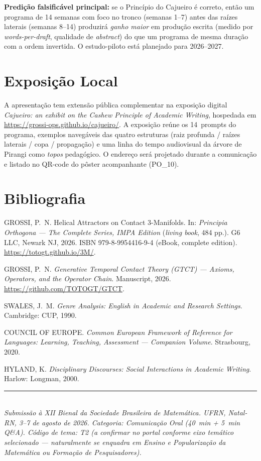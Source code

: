 \documentclass[11pt,a4paper]{article}
\begin{document}
\noindent \textbf{Predição falsificável principal:} se o Princípio do Cajueiro é correto, então um programa de 14 semanas com foco no tronco (semanas 1--7) antes das raízes laterais (semanas 8--14) produzirá \emph{ganho maior} em produção escrita (medido por \emph{words-per-draft}, qualidade de \emph{abstract}) do que um programa de mesma duração com a ordem invertida. O estudo-piloto está planejado para 2026--2027.

\section*{Exposição Local}

A apresentação tem extensão pública complementar na exposição digital \emph{Cajueiro: an exhibit on the Cashew Principle of Academic Writing}, hospedada em \url{https://grossi-ops.github.io/cajueiro/}. A exposição reúne os 14~prompts do programa, exemplos navegáveis das quatro estruturas (raiz profunda / raízes laterais / copa / propagação) e uma linha do tempo audiovisual da árvore de Pirangi como \emph{topos} pedagógico. O endereço será projetado durante a comunicação e listado no QR-code do pôster acompanhante (PO\_10).

\section*{Bibliografia}

\begin{enumerate}[leftmargin=2em,itemsep=0em,label={[\arabic*]}]
  \item GROSSI, P.~N. Helical Attractors on Contact 3-Manifolds. In: \emph{Principia Orthogona --- The Complete Series, IMPA Edition} (\emph{living book}, 484 pp.). G6 LLC, Newark NJ, 2026. ISBN 979-8-9954416-9-4 (eBook, complete edition). \url{https://totogt.github.io/3M/}.
  \item GROSSI, P.~N. \emph{Generative Temporal Contact Theory (GTCT) --- Axioms, Operators, and the Operator Chain}. Manuscript, 2026. \url{https://github.com/TOTOGT/GTCT}.
  \item SWALES, J.~M. \emph{Genre Analysis: English in Academic and Research Settings}. Cambridge: CUP, 1990.
  \item COUNCIL OF EUROPE. \emph{Common European Framework of Reference for Languages: Learning, Teaching, Assessment --- Companion Volume}. Strasbourg, 2020.
  \item HYLAND, K. \emph{Disciplinary Discourses: Social Interactions in Academic Writing}. Harlow: Longman, 2000.
\end{enumerate}

\vspace{1em}
\noindent\rule{\linewidth}{0.3pt}\\[0.3em]
\footnotesize
\emph{Submissão à XII Bienal da Sociedade Brasileira de Matemática. UFRN, Natal-RN, 3--7 de agosto de 2026. Categoria: Comunicação Oral (40~min + 5~min Q\&A). Código de tema: T2 (a confirmar no portal conforme eixo temático selecionado --- naturalmente se enquadra em \emph{Ensino e Popularização da Matemática} ou \emph{Formação de Pesquisadores}).}
\end{document}
